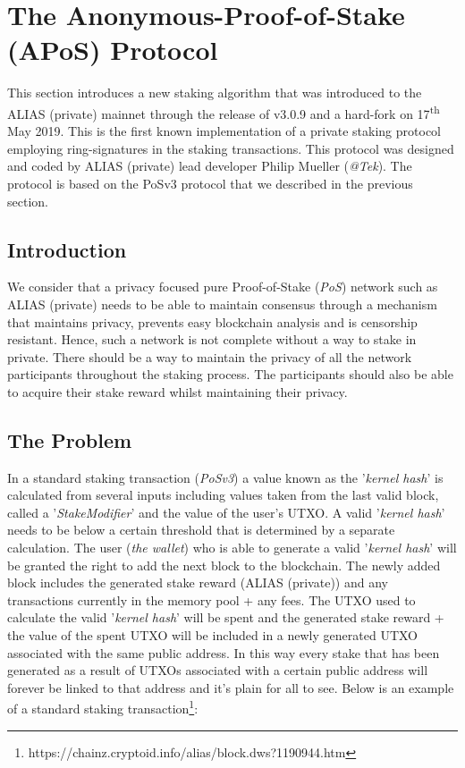 \section{The Anonymous-Proof-of-Stake (APoS) Protocol}
This section introduces a new staking algorithm that was introduced to the
ALIAS (private) mainnet through the release of v3.0.9 and a hard-fork on
17\textsuperscript{th} May 2019. This is the first known implementation
of a private staking protocol employing ring-signatures in the staking
transactions. This protocol was designed and coded by ALIAS (private) lead
developer Philip Mueller (\textit{@Tek}). The protocol is based on the
PoSv3 protocol that we described in the previous section.



\subsection{Introduction}
We consider that a privacy focused pure Proof-of-Stake (\textit{PoS})
network such as ALIAS (private) needs to be able to maintain consensus through
a mechanism that maintains privacy, prevents easy blockchain analysis and
is censorship resistant. Hence, such a network is not complete without a
way to stake in private. There should be a way to maintain the privacy of
all the network participants throughout the staking process. The
participants should also be able to acquire their stake reward whilst
maintaining their privacy.



\subsection{The Problem}

In a standard staking transaction (\textit{PoSv3}) a value known as the
'\textit{kernel hash}' is calculated from several inputs including values
taken from the last valid block, called a '\textit{StakeModifier}' and
the value of the user's UTXO. A valid '\textit{kernel hash}' needs to be
below a certain threshold that is determined by a separate calculation.
The user (\textit{the wallet}) who is able to generate a valid
'\textit{kernel hash}' will be granted the right to add the next block
to the blockchain. The newly added block includes the generated stake
reward (ALIAS (private)) and any transactions currently in the memory pool + any
fees. The UTXO used to calculate the valid '\textit{kernel hash}' will
be spent and the generated stake reward + the value of the spent UTXO
will be included in a newly generated UTXO associated with the same public
address. In this way every stake that has been generated as a result of
UTXOs associated with a certain public address will forever be linked to
that address and it's plain for all to see. Below is an example of a
standard staking transaction\footnote{https://chainz.cryptoid.info/alias/block.dws?1190944.htm}:



